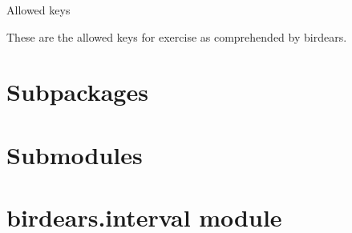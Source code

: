 \documentclass[letterpaper,10pt,english]{sphinxmanual}
\begin{document}

\begin{fulllineitems}
\label{\detokenize{index:birdears.KEYS}}
 \textendash{} Allowed keys

These are the allowed keys for exercise as comprehended by birdears.

\end{fulllineitems}



\section{Subpackages}
\label{\detokenize{index:subpackages}}

\section{Submodules}
\label{\detokenize{index:submodules}}

\section{birdears.interval module}
\label{\detokenize{index:module-birdears.interval}}\label{\detokenize{index:birdears-interval-module}}
\end{document}
